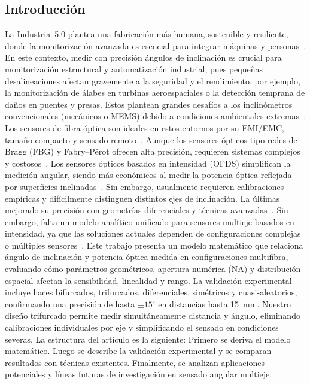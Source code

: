 \documentclass[11pt,a4paper]{article}
\begin{document}
\begin{multicols}{2}\raggedcolumns
\section{Introducción}
La Industria~5.0 plantea una fabricación más humana, sostenible y resiliente, donde la monitorización avanzada es esencial para integrar máquinas y personas~\cite{european_commission_industry5_2021}. En este contexto, medir con precisión ángulos de inclinación es crucial para monitorización estructural y automatización industrial, pues pequeñas desalineaciones afectan gravemente a la seguridad y el rendimiento, por ejemplo, la monitorización de álabes en turbinas aeroespaciales o la detección temprana de daños en puentes y presas. Estos plantean grandes desafíos a los inclinómetros convencionales (mecánicos o MEMS) debido a condiciones ambientales extremas~\cite{Pan2024}. Los sensores de fibra óptica son ideales en estos entornos por su EMI/EMC, tamaño compacto y sensado remoto~\cite{Sharbirin2019,Wang2023}. Aunque los sensores ópticos tipo redes de Bragg (FBG) y Fabry–Pérot ofrecen alta precisión, requieren sistemas complejos y costosos~\cite{Guo2015,Zhao2016}. Los sensores ópticos basados en intensidad (OFDS) simplifican la medición angular, siendo más económicos al medir la potencia óptica reflejada por superficies inclinadas~\cite{zubia_high-performance_2025,zubia_design_2024,zubia_algorithm_2022}. Sin embargo, usualmente requieren calibraciones empíricas y difícilmente distinguen distintos ejes de inclinación. La últimas mejorado su precisión con geometrías diferenciales y técnicas avanzadas~\cite{Vadapalli2021,shimizu_optical_2019}. Sin embargo, falta un modelo analítico unificado para sensores multieje basados en intensidad, ya que las soluciones actuales dependen de configuraciones complejas o múltiples sensores~\cite{Lee2014,zubia_-depth_2024,zubia_mathematical_2024}. Este trabajo presenta un modelo matemático que relaciona ángulo de inclinación y potencia óptica medida en configuraciones multifibra, evaluando cómo parámetros geométricos, apertura numérica (NA) y distribución espacial afectan la sensibilidad, linealidad y rango. La validación experimental incluye haces bifurcados, trifurcados, diferenciales, simétricos y cuasi-aleatorios, confirmando una precisión de hasta $\pm15^\circ$ en distancias hasta 15~mm. Nuestro diseño trifurcado permite medir simultáneamente distancia y ángulo, eliminando calibraciones individuales por eje y simplificando el sensado en condiciones severas. La estructura del artículo es la siguiente: Primero se deriva el modelo matemático. Luego se describe la validación experimental y se comparan resultados con técnicas existentes. Finalmente, se analizan aplicaciones potenciales y líneas futuras de investigación en sensado angular multieje.

\end{multicols}
\end{document}

